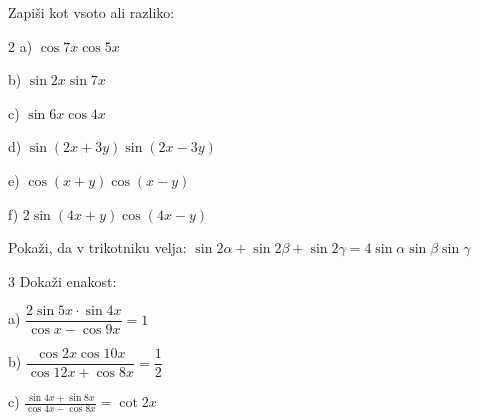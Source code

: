 \documentclass[a4paper,12pt]{letter}
\begin{document}
\begin{naloga}
    Zapiši kot vsoto ali razliko:
\begin{multicols}{2}
    a) $\cos 7x\cos 5x$

    b) $\sin 2x\sin 7x$

    c) $\sin 6x\cos 4x$

    d) $\sin (2x+3y)\sin(2x-3y)$

    e) $\cos (x+y)\cos(x-y)$

    f) $2\sin (4x+y)\cos(4x-y)$
    \end{multicols}
\end{naloga}
\begin{naloga}
Pokaži, da v trikotniku velja:
 $\sin 2\alpha+\sin2\beta+\sin2\gamma=4\sin\alpha\sin\beta\sin\gamma$
\end{naloga}
\begin{naloga}
\begin{multicols}{3}
    Dokaži enakost:

    a) $\dfrac{2\sin 5x\cdot \sin 4x}{\cos x-\cos 9x}=1$

    b) $\dfrac{\cos 2x\cos 10x}{\cos 12 x+\cos 8x}= \dfrac{1}{2}$

    c) $\frac{\sin 4x + \sin 8x}{\cos 4x - \cos 8x} = \cot 2x
$
\end{multicols}
\end{naloga}
\newpage
\end{document}
